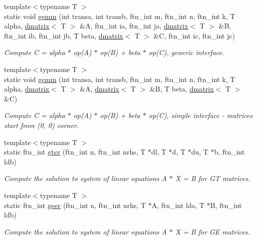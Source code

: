 \begin{DoxyCompactItemize}
{\footnotesize template$<$typename T $>$ }\\static void \hyperlink{classsddk_1_1linalg_3_01_c_p_u_01_4_af8b54f169a040bd2e2110df19f529837}{gemm} (int transa, int transb, ftn\+\_\+int m, ftn\+\_\+int n, ftn\+\_\+int k, T alpha, \hyperlink{classsddk_1_1dmatrix}{dmatrix}$<$ T $>$ \&A, ftn\+\_\+int ia, ftn\+\_\+int ja, \hyperlink{classsddk_1_1dmatrix}{dmatrix}$<$ T $>$ \&B, ftn\+\_\+int ib, ftn\+\_\+int jb, T beta, \hyperlink{classsddk_1_1dmatrix}{dmatrix}$<$ T $>$ \&C, ftn\+\_\+int ic, ftn\+\_\+int jc)
\begin{DoxyCompactList}\small\item\em Compute C = alpha $\ast$ op(\+A) $\ast$ op(\+B) + beta $\ast$ op(\+C), generic interface. \end{DoxyCompactList}\item 
{\footnotesize template$<$typename T $>$ }\\static void \hyperlink{classsddk_1_1linalg_3_01_c_p_u_01_4_ad1fe6bac1bc68aa8ec2becca2336c996}{gemm} (int transa, int transb, ftn\+\_\+int m, ftn\+\_\+int n, ftn\+\_\+int k, T alpha, \hyperlink{classsddk_1_1dmatrix}{dmatrix}$<$ T $>$ \&A, \hyperlink{classsddk_1_1dmatrix}{dmatrix}$<$ T $>$ \&B, T beta, \hyperlink{classsddk_1_1dmatrix}{dmatrix}$<$ T $>$ \&C)
\begin{DoxyCompactList}\small\item\em Compute C = alpha $\ast$ op(\+A) $\ast$ op(\+B) + beta $\ast$ op(\+C), simple interface -\/ matrices start from (0, 0) corner. \end{DoxyCompactList}\item 
{\footnotesize template$<$typename T $>$ }\\static ftn\+\_\+int \hyperlink{classsddk_1_1linalg_3_01_c_p_u_01_4_a99b683509a480a3ec6bdd21c9ae49345}{gtsv} (ftn\+\_\+int n, ftn\+\_\+int nrhs, T $\ast$dl, T $\ast$d, T $\ast$du, T $\ast$b, ftn\+\_\+int ldb)
\begin{DoxyCompactList}\small\item\em Compute the solution to system of linear equations A $\ast$ X = B for G\+T matrices. \end{DoxyCompactList}\item 
{\footnotesize template$<$typename T $>$ }\\static ftn\+\_\+int \hyperlink{classsddk_1_1linalg_3_01_c_p_u_01_4_af7141fa0a3a59383f32672114938aba2}{gesv} (ftn\+\_\+int n, ftn\+\_\+int nrhs, T $\ast$A, ftn\+\_\+int lda, T $\ast$B, ftn\+\_\+int ldb)
\begin{DoxyCompactList}\small\item\em Compute the solution to system of linear equations A $\ast$ X = B for G\+E matrices. \end{DoxyCompactList}\item 

\end{DoxyCompactItemize}
